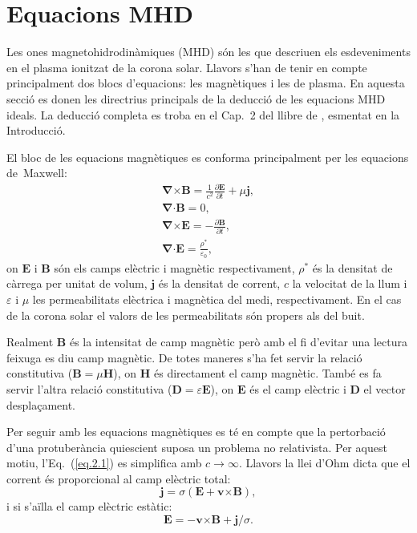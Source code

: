 
\chapter{Equacions MHD} \label{sec:equacionsMHD}
Les ones magnetohidrodinàmiques (MHD) són les que descriuen els esdeveniments en el plasma ionitzat de la corona solar.
Llavors s'han de tenir en compte principalment dos blocs d'equacions: les magnètiques i les de plasma.
En aquesta secció es donen les directrius principals de la deducció de les equacions MHD ideals.
La deducció completa es troba en el Cap.~2 del llibre de \textcite{Priest_2014}, esmentat en la Introducció.

El bloc de les equacions magnètiques es conforma principalment per les equacions de~Maxwell:
\begin{gather}
	\bm{\nabla} \bm{\times} \bm{B} = \frac{1}{c^2} \frac{\partial \bm{E}}{\partial t} + \mu \bm{j}, \tag{2.1} \label{eq.2.1} \\
	\bm{\nabla} \bm{\cdot} \bm{B} = 0, \tag{2.2} \label{eq.2.2} \\
	\bm{\nabla} \bm{\times} \bm{E} = - \frac{\partial \bm{B}}{\partial t}, \tag{2.3} \label{eq.2.3} \\
	\bm{\nabla} \bm{\cdot} \bm{E} = \frac{\rho^*}{\varepsilon_0}, \tag{2.4} \label{eq.2.4}
\end{gather}
on $\bm{E}$ i $\bm{B}$ són els camps elèctric i magnètic respectivament, $\rho^*$ és la densitat de càrrega per unitat de volum,
$\bm{j}$ és la densitat de corrent, $c$ la velocitat de la llum i $\varepsilon$ i $\mu$ les permeabilitats elèctrica i magnètica del medi, respectivament.
En el cas de la corona solar el valors de les permeabilitats són propers als del buit.

Realment $\bm{B}$ és la intensitat de camp magnètic però amb el fi d'evitar una lectura feixuga es diu camp magnètic.
De totes maneres s'ha fet servir la relació constitutiva ($\bm{B} = \mu \bm{H}$), on $\bm{H}$ és directament el camp magnètic.
També es fa servir l'altra relació constitutiva ($\bm{D} = \varepsilon \bm{E}$), on $\bm{E}$ és el camp elèctric i $\bm{D}$ el vector desplaçament.

Per seguir amb les equacions magnètiques es té en compte que la pertorbació d'una protuberància quiescient suposa un problema no relativista.
Per aquest motiu, l'Eq.~(\ref{eq.2.1}) es simplifica amb $c \rightarrow \infty$.
Llavors la llei d'Ohm dicta que el corrent és proporcional al camp elèctric total:
\begin{equation}
	\bm{j} =  \sigma (\bm{E} + \bm{v} \bm{\times} \bm{B}), \tag{2.5} \label{eq.2.5}
\end{equation}
i si s'aïlla el camp elèctric estàtic:
\begin{equation}
	\bm{E} = - \bm{v} \bm{\times} \bm{B} + \bm{j}/\sigma. \tag{2.6} \label{eq.2.6}
\end{equation}

